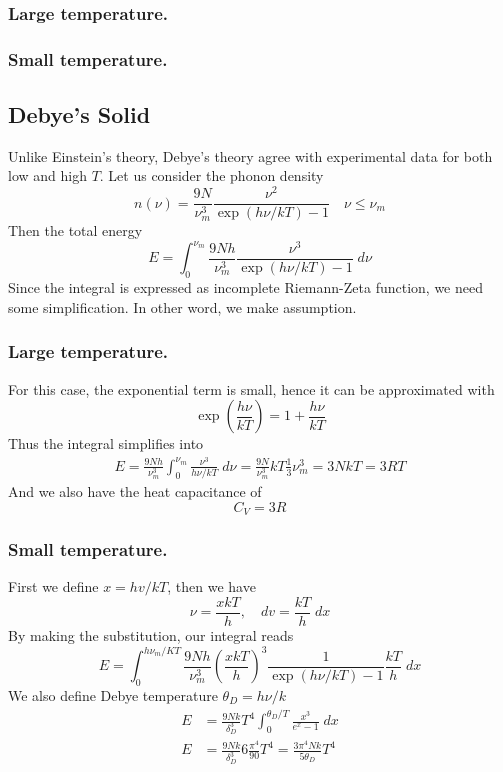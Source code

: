 \documentclass[../../../Main.tex]{subfiles}
\begin{document}
\subsubsection*{Large temperature.}
\subsubsection*{Small temperature.}

\subsection*{Debye's Solid}
Unlike Einstein's theory, Debye's theory agree with experimental data for both low and high $T$. Let us consider the phonon density
\begin{equation*}
    n(\nu)=\frac{9N}{\nu_m^3}\frac{\nu^2}{\exp(h\nu/kT)-1}\quad\nu\leq\nu_m
\end{equation*} 
Then the total energy
\begin{equation*}
    E=\int_{0}^{\nu_m}\frac{9Nh}{\nu_m^3}\frac{\nu^3}{\exp(h\nu/kT)-1}\;d\nu
\end{equation*}
Since the integral is expressed as incomplete Riemann-Zeta function, we need some simplification. In other word, we make assumption.

\subsubsection*{Large temperature.} For this case, the exponential term is small, hence it can be approximated with
\begin{equation*}
    \exp\left(\frac{h\nu}{kT}\right)=1+\frac{h\nu}{kT}
\end{equation*}
Thus the integral simplifies into
\begin{align*}
    E=\frac{9Nh}{\nu_m^3}\int_{0}^{\nu_m}\frac{\nu^3}{h\nu/kT}\;d\nu= \frac{9N}{\nu_m^3}kT\frac{1}{3}\nu_m^3=3NkT=3RT
\end{align*}
And we also have the heat capacitance of 
\begin{equation*}
    C_V=3R
\end{equation*}

\subsubsection*{Small temperature.} First we define $x=hv/kT$, then we have 
\begin{equation*}
    \nu=\frac{xkT}{h},\quad dv=\frac{kT}{h}\;dx
\end{equation*}
By making the substitution, our integral reads 
\begin{equation*}
    E=\int_{0}^{h\nu_m/KT}\frac{9Nh}{\nu_m^3}\left(\frac{xkT}{h}\right)^3\frac{1}{\exp(h\nu/kT)-1}\frac{kT}{h}\;dx
\end{equation*}
We also define Debye temperature $\theta_D=h\nu/k$
\begin{align*}
    E&=\frac{9Nk}{\delta_D^3}T^4\int_{0}^{\theta_D/T}\frac{x^3}{e^x-1}\;dx\\
    E&=\frac{9Nk}{\delta_D^3}6\frac{\pi^4}{90}T^4=\frac{3\pi^4Nk}{5\theta_D}T^4
\end{align*}
\end{document}
